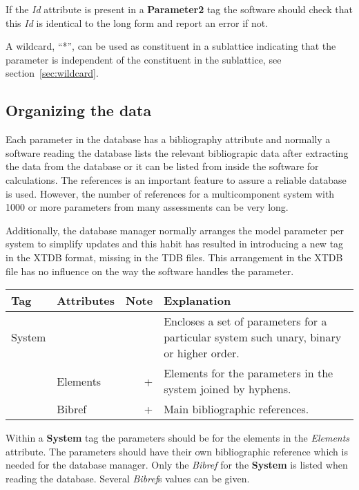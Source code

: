 \documentclass{article}
\begin{document}
If the {\em Id} attribute is present in a {\bf Parameter2} tag the
software should check that this {\em Id} is identical to the long form
and report an error if not.

A wildcard, ``*'', can be used as constituent in a sublattice
indicating that the parameter is independent of the constituent in
the sublattice, see section~\ref{sec:wildcard}.

\newpage 

\subsection{Organizing the data}\label{sec:subsys}

Each parameter in the database has a bibliography attribute and
normally a software reading the database lists the relevant
bibliograpic data after extracting the data from the database or it
can be listed from inside the software for calculations.  The
references is an important feature to assure a reliable database is
used.  However, the number of references for a multicomponent system
with 1000 or more parameters from many assessments can be very long.

Additionally, the database manager normally arranges the model
parameter per system to simplify updates and this habit has resulted
in introducing a new tag in the XTDB format, missing in the TDB files.
This arrangement in the XTDB file has no influence on the way the
software handles the parameter.

\bigskip
\begin{tabular}{|p{} p{} r p{}|}\hline
  Tag & Attributes & Note & Explanation\\\hline

  System  &&& Encloses a set of parameters for a particular system
                     such unary, binary or higher order.\\
          & Elements &+& Elements for the parameters in the system joined
                       by hyphens.\\
          & Bibref &+& Main bibliographic references.\\\hline
                       
\end{tabular}

\bigskip
Within a {\bf System} tag the parameters should be for the elements in
the {\em Elements} attribute.  The parameters should have their own
bibliographic reference which is needed for the database manager.
Only the {\em Bibref} for the {\bf System} is listed when reading the
database.  Several {\em Bibref}s values can be given.
\end{document}
